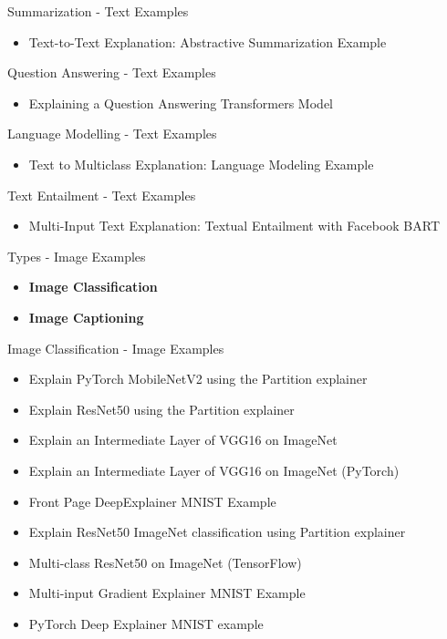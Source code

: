 \documentclass[aspectratio=169]{beamer}
\begin{document}
\begin{frame}{Summarization - Text Examples}
    \begin{itemize}
        \item Text-to-Text Explanation: Abstractive Summarization Example
    \end{itemize}   
\end{frame}

\begin{frame}{Question Answering - Text Examples}
    \begin{itemize}
        \item Explaining a Question Answering Transformers Model
    \end{itemize}   
\end{frame}

\begin{frame}{Language Modelling - Text Examples}
    \begin{itemize}
        \item Text to Multiclass Explanation: Language Modeling Example
    \end{itemize}   
\end{frame}

\begin{frame}{Text Entailment - Text Examples}
    \begin{itemize}
        \item Multi-Input Text Explanation: Textual Entailment with Facebook BART
    \end{itemize}
\end{frame}

\begin{frame}{Types - Image Examples}
    \begin{itemize}
        \item \textbf{Image Classification}
        \item \textbf{Image Captioning}
    \end{itemize}
\end{frame}

\begin{frame}{Image Classification - Image Examples}
    \begin{itemize}
        \item Explain PyTorch MobileNetV2 using the Partition explainer
        \item Explain ResNet50 using the Partition explainer
        \item Explain an Intermediate Layer of VGG16 on ImageNet
        \item Explain an Intermediate Layer of VGG16 on ImageNet (PyTorch)
        \item Front Page DeepExplainer MNIST Example
        \item Explain ResNet50 ImageNet classification using Partition explainer
        \item Multi-class ResNet50 on ImageNet (TensorFlow)
        \item Multi-input Gradient Explainer MNIST Example
        \item PyTorch Deep Explainer MNIST example
    \end{itemize}
\end{frame}
\end{document}
